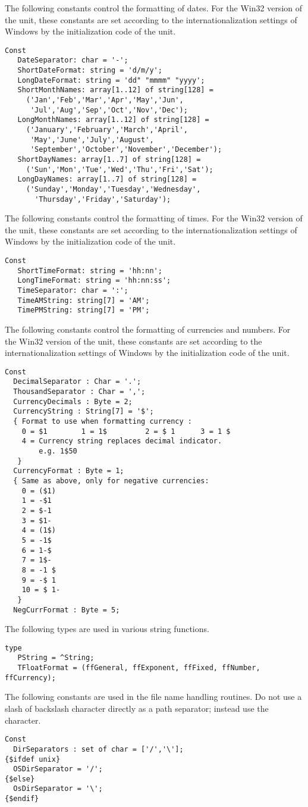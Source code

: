 The following constants control the formatting of dates.
For the Win32 version of the  unit, these 
constants are set according to the internationalization 
settings of Windows by the initialization code of the unit.
\begin{verbatim}
Const 
   DateSeparator: char = '-';
   ShortDateFormat: string = 'd/m/y';
   LongDateFormat: string = 'dd" "mmmm" "yyyy';
   ShortMonthNames: array[1..12] of string[128] =
     ('Jan','Feb','Mar','Apr','May','Jun',
      'Jul','Aug','Sep','Oct','Nov','Dec');
   LongMonthNames: array[1..12] of string[128] =
     ('January','February','March','April',
      'May','June','July','August',
      'September','October','November','December');
   ShortDayNames: array[1..7] of string[128] =
     ('Sun','Mon','Tue','Wed','Thu','Fri','Sat');
   LongDayNames: array[1..7] of string[128] =
     ('Sunday','Monday','Tuesday','Wednesday',
       'Thursday','Friday','Saturday');
\end{verbatim}  

The following constants control the formatting of times.
For the Win32 version of the  unit, these 
constants are set according to the internationalization 
settings of Windows by the initialization code of the unit.
\begin{verbatim}
Const
   ShortTimeFormat: string = 'hh:nn';
   LongTimeFormat: string = 'hh:nn:ss';
   TimeSeparator: char = ':';
   TimeAMString: string[7] = 'AM';
   TimePMString: string[7] = 'PM';
\end{verbatim}

The following constants control the formatting of currencies 
and numbers. For the Win32 version of the  unit, 
these  constants are set according to the internationalization 
settings of Windows by the initialization code of the unit.
\begin{verbatim}
Const
  DecimalSeparator : Char = '.';
  ThousandSeparator : Char = ',';
  CurrencyDecimals : Byte = 2;
  CurrencyString : String[7] = '$';
  { Format to use when formatting currency :
    0 = $1        1 = 1$         2 = $ 1      3 = 1 $
    4 = Currency string replaces decimal indicator. 
        e.g. 1$50 
   }
  CurrencyFormat : Byte = 1;
  { Same as above, only for negative currencies:
    0 = ($1)
    1 = -$1
    2 = $-1
    3 = $1-
    4 = (1$)
    5 = -1$
    6 = 1-$
    7 = 1$-
    8 = -1 $
    9 = -$ 1
    10 = $ 1-
   }
  NegCurrFormat : Byte = 5;
\end{verbatim}
The following types are used in various string functions.
\begin{verbatim}
type
   PString = ^String;
   TFloatFormat = (ffGeneral, ffExponent, ffFixed, ffNumber, ffCurrency);
\end{verbatim}
The following constants are used in the file name handling routines. Do not
use a slash of backslash character directly as a path separator; instead 
use the  character.
\begin{verbatim}
Const
  DirSeparators : set of char = ['/','\'];  
{$ifdef unix}
  OSDirSeparator = '/';
{$else}
  OsDirSeparator = '\';
{$endif}
\end{verbatim}

